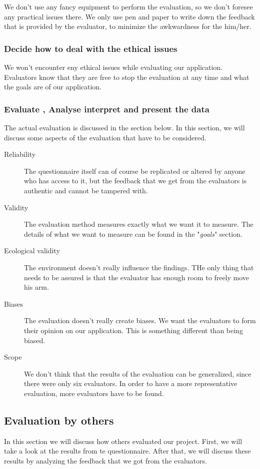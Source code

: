\documentclass{article}
\begin{document}
We don't use any fancy equipment to perform the evaluation, so we don't foresee any practical issues there. We only use pen and paper to write down the feedback that is provided by the evaluator, to minimize the awkwardness for the him/her.

\subsubsection{\textbf{D}ecide how to deal with the ethical issues}

We won't encounter eny ethical issues while evaluating our application. Evaluators know that they are free to stop the evaluation at any time and what the goals are of our application.

\subsubsection{\textbf{E}valuate , Analyse interpret and present the data}

The actual evaluation is discussed in the section below. In this section, we will discuss some aspects of the evaluation that have to be considered.
\begin{description}
\item[Reliability] The questionnaire itself can of course be replicated or altered by anyone who has access to it, but the feedback that we get from the evaluators is authentic and cannot be tampered with.
\item[Validity] The evaluation method measures exactly what we want it to measure. The details of what we want to measure can be found in the "\textit{goals}" section.
\item[Ecological validity] The environment doesn't really influence the findings. THe only thing that needs to be assured is that the evaluator has enough room to freely move his arm.
\item[Biases] The evaluation doesn't really create biases. We want the evaluators to form their opinion on our application. This is something different than being biased.
\item[Scope] We don't think that the results of the evaluation can be generalized, since there were only six evaluators. In order to have a more representative evaluation, more evaluators have to be found.
\end{description}

\subsection{Evaluation by others}
In this section we will discuss how others evaluated our project. First, we will take a look at the results from te questionnaire. After that, we will discuss these results by analyzing the feedback that we got from the evaluators.
\end{document}
